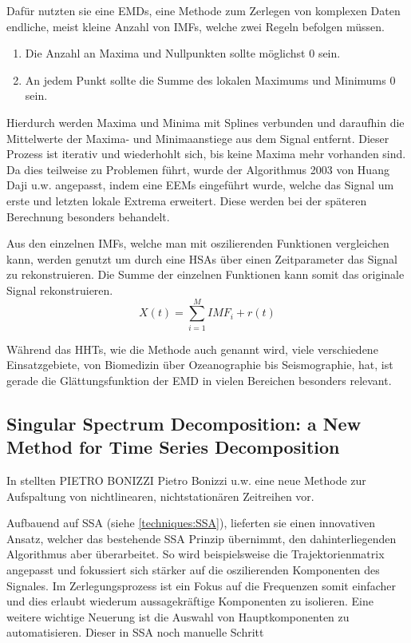 Dafür nutzten sie eine \acp{EMD}, eine Methode zum Zerlegen von komplexen Daten endliche, meist kleine Anzahl von \acp{IMF}, welche zwei Regeln befolgen müssen.
\begin{enumerate}
    \item Die Anzahl an Maxima und Nullpunkten sollte möglichst 0 sein.
    \item An jedem Punkt sollte die Summe des lokalen Maximums und Minimums 0 sein.
\end{enumerate}

Hierdurch werden Maxima und Minima mit Splines verbunden und daraufhin die Mittelwerte der Maxima- und Minimaanstiege aus dem Signal entfernt.
Dieser Prozess ist iterativ und wiederhohlt sich, bis keine Maxima mehr vorhanden sind.
Da dies teilweise zu Problemen führt, wurde der Algorithmus 2003 von Huang Daji u.w.\cite{daji2003practical} angepasst,
indem eine \acp{EEM} eingeführt wurde, welche das Signal um erste und letzten lokale Extrema erweitert. Diese werden bei der späteren Berechnung besonders behandelt.

Aus den einzelnen \ac{IMF}s, welche man mit oszilierenden Funktionen vergleichen kann, werden genutzt um durch eine \acp{HSA} über einen Zeitparameter das Signal zu rekonstruieren.
Die Summe der einzelnen Funktionen kann somit das originale Signal rekonstruieren.
\begin{equation}
    X(t) = \sum_{i=1}^{M} IMF_{i} + r(t)
\end{equation}

Während das \acp{HHT}, wie die Methode auch genannt wird, viele verschiedene Einsatzgebiete, von
Biomedizin über Ozeanographie bis Seismographie, hat, ist gerade die Glättungsfunktion der \ac{EMD} in vielen Bereichen besonders relevant.


\subsection{Singular Spectrum Decomposition: a New Method for Time Series Decomposition}
In \cite{doi:10.1142/S1793536914500113} stellten PIETRO BONIZZI Pietro Bonizzi u.w. eine neue Methode zur Aufspaltung von nichtlinearen, nichtstationären Zeitreihen vor.

Aufbauend auf \ac{SSA} (siehe \ref*{techniques:SSA}), lieferten sie einen innovativen Ansatz, welcher das bestehende \ac{SSA} Prinzip übernimmt, den dahinterliegenden Algorithmus aber überarbeitet.
So wird beispielsweise die Trajektorienmatrix angepasst und fokussiert sich stärker auf die oszilierenden Komponenten des Signales.
Im Zerlegungsprozess ist ein Fokus auf die Frequenzen somit einfacher und dies erlaubt wiederum aussagekräftige Komponenten zu isolieren.
Eine weitere wichtige Neuerung ist die Auswahl von Hauptkomponenten zu automatisieren. Dieser in SSA noch manuelle Schritt


